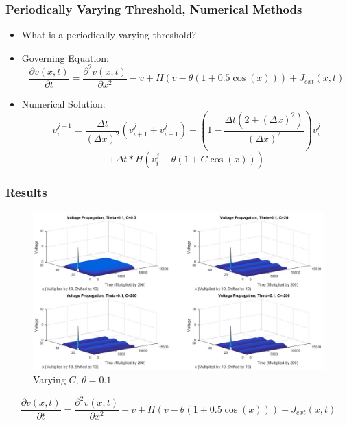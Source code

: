 \documentclass{beamer}
\begin{document}
\begin{frame}
\frametitle{Periodically Varying Threshold, Numerical Methods}
\begin{itemize}
	\item{What is a periodically varying threshold?}
	\item{Governing Equation:}
\[\frac{\partial{v(x,t)}}{\partial{t}}=\frac{\partial^2{v(x,t)}}{\partial{x}^2}-v+H(v-\theta(1+0.5\cos(x)))+J_{ext}(x,t)\]
	\item{Numerical Solution:}
\[v^{j+1}_i=\frac{\Delta{t}}{(\Delta{x})^2}(v^{j}_{i+1}+v^{j}_{i-1})+(1-\frac{\Delta{t}(2+(\Delta{x})^2)}{(\Delta{x})^2})v^{j}_{i}\]
\[+\Delta{t}*H(v^j_i-\theta(1+C\cos(x)))\]
\end{itemize}
\end{frame}


\begin{frame}
\frametitle{Results}
\begin{figure}[H]
  \includegraphics[width=\linewidth]{plotsomething2}
  \caption{Varying $C$, $\theta=0.1$}
  \label{fig:sketch10}
\end{figure}
\[\frac{\partial{v(x,t)}}{\partial{t}}=\frac{\partial^2{v(x,t)}}{\partial{x}^2}-v+H(v-\theta(1+0.5\cos(x)))+J_{ext}(x,t)\]
\end{frame}
\end{document}
